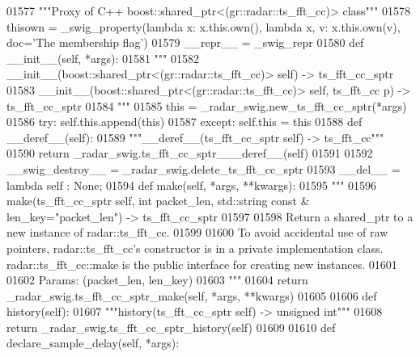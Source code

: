 \begin{DoxyCode}
{{{{{{{01577     \textcolor{stringliteral}{"""Proxy of C++ boost::shared\_ptr<(gr::radar::ts\_fft\_cc)> class"""}
01578     thisown = _swig_property(\textcolor{keyword}{lambda} x: x.this.own(), \textcolor{keyword}{lambda} x, v: x.this.own(v), doc=\textcolor{stringliteral}{'The membership flag'})
01579     \_\_repr\_\_ = \_swig\_repr
01580     \textcolor{keyword}{def }__init__(self, *args): 
01581         \textcolor{stringliteral}{"""}
01582 \textcolor{stringliteral}{        \_\_init\_\_(boost::shared\_ptr<(gr::radar::ts\_fft\_cc)> self) -> ts\_fft\_cc\_sptr}
01583 \textcolor{stringliteral}{        \_\_init\_\_(boost::shared\_ptr<(gr::radar::ts\_fft\_cc)> self, ts\_fft\_cc p) -> ts\_fft\_cc\_sptr}
01584 \textcolor{stringliteral}{        """}
01585         this = \_radar\_swig.new\_ts\_fft\_cc\_sptr(*args)
01586         \textcolor{keywordflow}{try}: self.this.append(this)
01587         \textcolor{keywordflow}{except}: self.this = this
01588     \textcolor{keyword}{def }__deref__(self):
01589         \textcolor{stringliteral}{"""\_\_deref\_\_(ts\_fft\_cc\_sptr self) -> ts\_fft\_cc"""}
01590         \textcolor{keywordflow}{return} \_radar\_swig.ts\_fft\_cc\_sptr\_\_\_deref\_\_(self)
01591 
01592     \_\_swig\_destroy\_\_ = \_radar\_swig.delete\_ts\_fft\_cc\_sptr
01593     \_\_del\_\_ = \textcolor{keyword}{lambda} self : \textcolor{keywordtype}{None};
01594     \textcolor{keyword}{def }make(self, *args, **kwargs):
01595         \textcolor{stringliteral}{"""}
01596 \textcolor{stringliteral}{        make(ts\_fft\_cc\_sptr self, int packet\_len, std::string const & len\_key="packet\_len") ->
       ts\_fft\_cc\_sptr}
01597 \textcolor{stringliteral}{}
01598 \textcolor{stringliteral}{        Return a shared\_ptr to a new instance of radar::ts\_fft\_cc.}
01599 \textcolor{stringliteral}{}
01600 \textcolor{stringliteral}{        To avoid accidental use of raw pointers, radar::ts\_fft\_cc's constructor is in a private
       implementation class. radar::ts\_fft\_cc::make is the public interface for creating new instances.}
01601 \textcolor{stringliteral}{}
01602 \textcolor{stringliteral}{        Params: (packet\_len, len\_key)}
01603 \textcolor{stringliteral}{        """}
01604         \textcolor{keywordflow}{return} \_radar\_swig.ts\_fft\_cc\_sptr\_make(self, *args, **kwargs)
01605 
01606     \textcolor{keyword}{def }history(self):
01607         \textcolor{stringliteral}{"""history(ts\_fft\_cc\_sptr self) -> unsigned int"""}
01608         \textcolor{keywordflow}{return} \_radar\_swig.ts\_fft\_cc\_sptr\_history(self)
01609 
01610     \textcolor{keyword}{def }declare_sample_delay(self, *args):
}}}}}}}
\end{DoxyCode}
